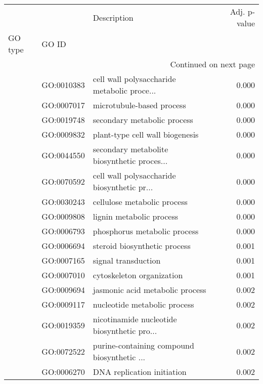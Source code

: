 \begin{longtable}{lllr}
\toprule
   &            &                                  Description &  Adj. p-value \\
GO type & GO ID &                                              &               \\
\midrule
\endhead
\midrule
\multicolumn{4}{r}{{Continued on next page}} \\
\midrule
\endfoot

\bottomrule
\endlastfoot
\multirow{149}{*}{BP} & GO:0010383 &  cell wall polysaccharide metabolic proce... &         0.000 \\
   & GO:0007017 &                    microtubule-based process &         0.000 \\
   & GO:0019748 &                  secondary metabolic process &         0.000 \\
   & GO:0009832 &              plant-type cell wall biogenesis &         0.000 \\
   & GO:0044550 &  secondary metabolite biosynthetic proces... &         0.000 \\
   & GO:0070592 &  cell wall polysaccharide biosynthetic pr... &         0.000 \\
   & GO:0030243 &                  cellulose metabolic process &         0.000 \\
   & GO:0009808 &                     lignin metabolic process &         0.000 \\
   & GO:0006793 &                 phosphorus metabolic process &         0.000 \\
   & GO:0006694 &                 steroid biosynthetic process &         0.001 \\
   & GO:0007165 &                          signal transduction &         0.001 \\
   & GO:0007010 &                    cytoskeleton organization &         0.001 \\
   & GO:0009694 &              jasmonic acid metabolic process &         0.002 \\
   & GO:0009117 &                 nucleotide metabolic process &         0.002 \\
   & GO:0019359 &  nicotinamide nucleotide biosynthetic pro... &         0.002 \\
   & GO:0072522 &  purine-containing compound biosynthetic ... &         0.002 \\
   & GO:0006270 &                   DNA replication initiation &         0.002 \\

\end{longtable}
